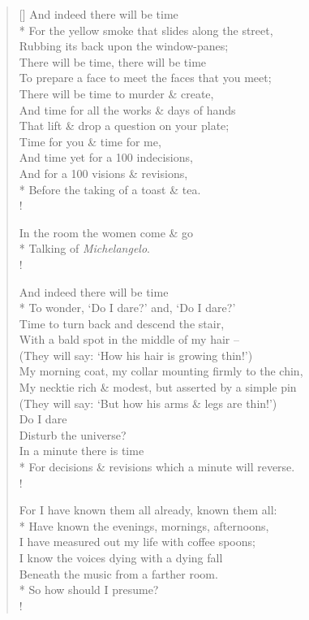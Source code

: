 \documentclass[MAIN]{subfiles}
\begin{document}
\begin{verse}[\versewidth]
And indeed there will be time\\*
For the yellow smoke that slides along the street,\\
Rubbing its back upon the window-panes;\\
There will be time, there will be time\\
To prepare a face to meet the faces that you meet;\\
There will be time to murder \& create,\\
And time for all the works \& days of hands\\
That lift \& drop a question on your plate;\\
Time for you \& time for me,\\ 
And time yet for a 100 indecisions,\\ 
And for a 100 visions \& revisions,\\*
Before the taking of a toast \& tea.\\!

In the room the women come \& go\\*
Talking of \emph{Michelangelo}.\\!

And indeed there will be time\\*
To wonder, `Do I dare?' and, `Do I dare?'\\
Time to turn back and descend the stair,\\
With a bald spot in the middle of my hair --\\
(They will say: `How his hair is growing thin!')\\
My morning coat, my collar mounting firmly to the chin,\\
My necktie rich \& modest, but asserted by a simple pin\\
(They will say: `But how his arms \& legs are thin!')\\
Do I dare\\
Disturb the universe?\\
In a minute there is time\\*
For decisions \& revisions which a minute will reverse.\\!

For I have known them all already, known them all:\\*
Have known the evenings, mornings, afternoons,\\
I have measured out my life with coffee spoons;\\
I know the voices dying with a dying fall\\
Beneath the music from a farther room.\\*
So how should I presume?\\!


\end{verse}
\end{document}

